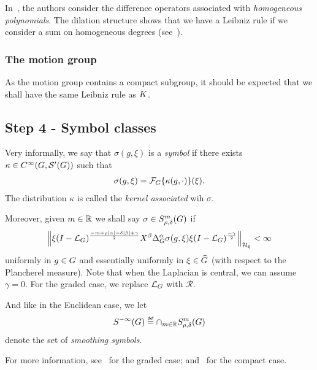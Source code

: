In~\cite{FischerRuzhansky16},
the authors consider the difference operators associated with \emph{homogeneous polynomials}.
The dilation structure
shows that we have a Leibniz rule if we consider a sum on homogeneous degrees
(see~\cite[Subsection 5.2.1]{FischerRuzhansky16}).

\subsubsection*{The motion group}

As the motion group contains a compact subgroup,
it should be expected that we shall have the same Leibniz rule as $K$.

\subsection*{Step 4 - Symbol classes}

Very informally,
we say that $\sigma(g, \xi)$ is a \emph{symbol} if there exists $\kappa \in {C^\infty(G, {\mathcal{S}' (G)})}$ such that
\begin{align*}
    \sigma(g, \xi) = \mathcal{F}_{G} \{\kappa(g, \cdot)\}(\xi).
\end{align*}
The distribution $\kappa$ is called the \emph{kernel associated} wih $\sigma$.

Moreover,
given $m \in \mathbb{R}$
we shall say $\sigma \in S^{m}_{\rho, \delta}(G)$ if
\begin{align*}
    \norm [\mathcal H_\xi] {%
        \xi \BesselPotential {-m + \rho \abs \alpha - \delta \abs \beta + \gamma}
        \LeftDifferentialOperator \beta \DifferenceOperatorOrder \alpha \sigma(g, \xi)
        \xi \BesselPotential {-\gamma}
    }
    < \infty
\end{align*}
uniformly in $g \in G$
and essentially uniformly in $\xi \in {\widehat{G}}$ (with respect to the Plancherel measure).
Note that when the Laplacian is central,
we can assume $\gamma = 0$.
For the graded case,
we replace ${\mathcal{L}_{G}}$ with $\mathcal R$.

And like in the Euclidean case,
we let
\begin{align*}
    \SmoothingSymbols \defeq \cap_{m \in \R} \SymbolClass m {\rho, \delta}
\end{align*}
denote the set of \emph{smoothing symbols}.

For more information,
see~\cite[Section 5.1]{FischerRuzhansky16} for the graded case;
and~\cite[Section 3.1]{Fischer2015} for the compact case.

